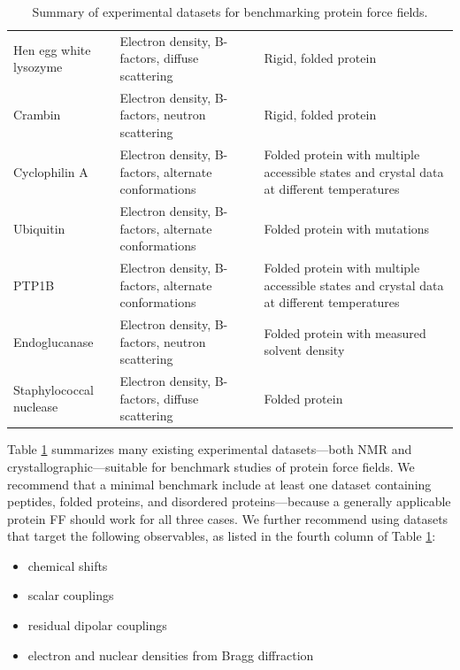\documentclass[9pt,review]{livecoms}
\begin{document}
\begin{table}[!ht]
\begin{tabular}{p{} p{} p{}}
Hen egg white lysozyme \cite{ramanadham_refinement_1990,meisburger_diffuse_2020,walsh_refinement_1998,wang_triclinic_2007,artymiuk_structures_1982,meisburger_robust_2023} & Electron density, B-factors, diffuse scattering & Rigid, folded protein \\
Crambin \cite{teeter_water_1984,chen_room-temperature_2012} & Electron density, B-factors, neutron scattering & Rigid, folded protein \\
Cyclophilin A \cite{keedy_mapping_2015,van_benschoten_measuring_2016,thompson_temperature-jump_2019,chen_solvent_2024} & Electron density, B-factors, alternate conformations & Folded protein with multiple accessible states and crystal data at different temperatures \\
Ubiquitin \cite{biel_flexibility_2017} & Electron density, B-factors, alternate conformations & Folded protein with mutations \\
PTP1B \cite{keedy_expanded_2018} & Electron density, B-factors, alternate conformations & Folded protein with multiple accessible states and crystal data at different temperatures \\
Endoglucanase \cite{nakamura_newtons_2015} & Electron density, B-factors, neutron scattering & Folded protein with measured solvent density \\
Staphylococcal nuclease \cite{wall_conformational_2014} & Electron density, B-factors, diffuse scattering & Folded protein \\
\bottomrule
\end{tabular}
\caption{Summary of experimental datasets for benchmarking protein force fields.}
\label{tab:datasets}
\end{table}

Table \ref{tab:datasets} summarizes many existing experimental datasets---both NMR and 
crystallographic---suitable for benchmark studies of protein force fields.
We recommend that a minimal benchmark include at least one dataset containing peptides, folded proteins, and disordered proteins---because a generally applicable protein FF should work for all three cases.
We further recommend using datasets that target the following observables, as listed in the fourth column of Table \ref{tab:datasets}:

\begin{itemize}
\item chemical shifts
\item scalar couplings
\item residual dipolar couplings
\item electron and nuclear densities from Bragg diffraction
\end{itemize}
\end{document}
